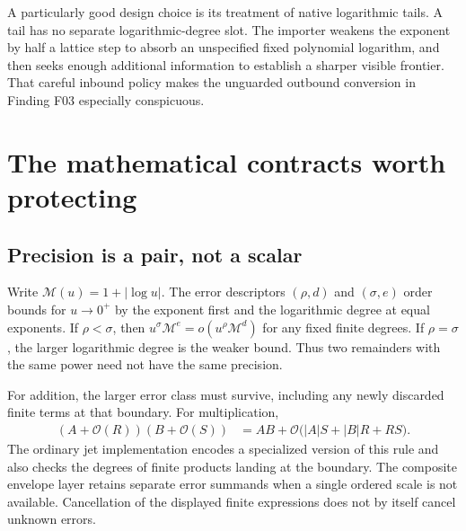\documentclass[11pt,letterpaper]{article}
\newcommand{\code}[1]{\texttt{\small\detokenize{#1}}}
\newcommand{\OO}{\mathcal O}
\newcommand{\M}{\mathcal M}
\begin{document}
A particularly good design choice is its treatment of native logarithmic tails. A \code{SeriesData} tail has no separate logarithmic-degree slot. The importer weakens the exponent by half a lattice step to absorb an unspecified fixed polynomial logarithm, and then seeks enough additional information to establish a sharper visible frontier. That careful inbound policy makes the unguarded outbound conversion in Finding F03 especially conspicuous.\cite{repo-native,wl-seriesdata}

\section{The mathematical contracts worth protecting}
\label{sec:contracts}
\subsection{Precision is a pair, not a scalar}
Write $\M(u)=1+|\log u|$. The error descriptors $(\rho,d)$ and $(\sigma,e)$ order bounds for $u\to0^+$ by the exponent first and the logarithmic degree at equal exponents. If $\rho<\sigma$, then $u^\sigma\M^e=o(u^\rho\M^d)$ for any fixed finite degrees. If $\rho=\sigma$, the larger logarithmic degree is the weaker bound. Thus two remainders with the same power need not have the same precision.

For addition, the larger error class must survive, including any newly discarded finite terms at that boundary. For multiplication,
\begin{align}
 (A+\OO(R))(B+\OO(S))
  &=AB+\OO\bigl(|A|S+|B|R+RS\bigr).
 \label{eq:mulbound}
\end{align}
The ordinary jet implementation encodes a specialized version of this rule and also checks the degrees of finite products landing at the boundary. The composite envelope layer retains separate error summands when a single ordered scale is not available. Cancellation of the displayed finite expressions does not by itself cancel unknown errors.\cite{repo-core,repo-envelope}
\end{document}
